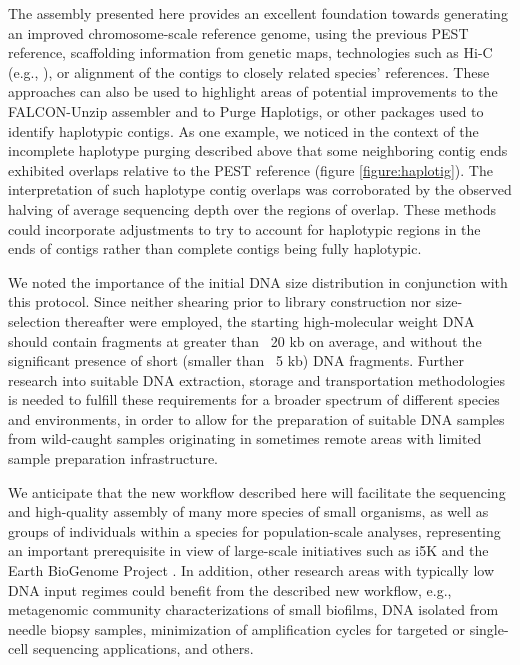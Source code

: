 \par{
The assembly presented here provides an excellent foundation towards generating an improved chromosome-scale reference genome, using the previous PEST reference, scaffolding information from genetic maps, technologies such as Hi-C (e.g., \cite{falconphase}), or alignment of the contigs to closely related species' references. These approaches can also be used to highlight areas of potential improvements to the FALCON-Unzip assembler and to Purge Haplotigs, or other packages used to identify haplotypic contigs. As one example, we noticed in the context of the incomplete haplotype purging described above that some neighboring contig ends exhibited overlaps relative to the PEST reference (figure \ref{figure:haplotig}). The interpretation of such haplotype contig overlaps was corroborated by the observed halving of average sequencing depth over the regions of overlap. These methods could incorporate adjustments to try to account for haplotypic regions in the ends of contigs rather than complete contigs being fully haplotypic.
}

\par{
We noted the importance of the initial DNA size distribution in conjunction with this protocol. Since neither shearing prior to library construction nor size-selection thereafter were employed, the starting high-molecular weight DNA should contain fragments at greater than ~20 kb on average, and without the significant presence of short (smaller than ~5 kb) DNA fragments. Further research into suitable DNA extraction, storage and transportation methodologies is needed to fulfill these requirements for a broader spectrum of different species and environments, in order to allow for the preparation of suitable DNA samples from wild-caught samples originating in sometimes remote areas with limited sample preparation infrastructure.
}
\par{
We anticipate that the new workflow described here will facilitate the sequencing and high-quality assembly of many more species of small organisms, as well as groups of individuals within a species for population-scale analyses, representing an important prerequisite in view of large-scale initiatives such as i5K and the Earth BioGenome Project \cite{EBGP}\cite{arthropoddiversity}. In addition, other research areas with typically low DNA input regimes could benefit from the described new workflow, e.g., metagenomic community characterizations of small biofilms, DNA isolated from needle biopsy samples, minimization of amplification cycles for targeted or single-cell sequencing applications, and others.
}


